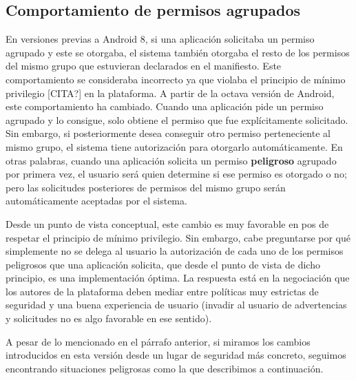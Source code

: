 \subsection{Comportamiento de permisos agrupados}
\label{subsection:recent-changes:grouped-permissions}
En versiones previas a Android 8, si una aplicación solicitaba un permiso agrupado y este se otorgaba, el
sistema también otorgaba el resto de los permisos del mismo grupo que estuvieran declarados en el
manifiesto. Este comportamiento se consideraba incorrecto ya que violaba el principio de mínimo
privilegio [CITA?] en la plataforma. A partir de la octava versión de Android, este comportamiento ha
cambiado. Cuando una aplicación pide un permiso agrupado y lo consigue, solo obtiene el permiso que fue
explícitamente solicitado. Sin embargo, si posteriormente desea conseguir otro permiso perteneciente al
mismo grupo, el sistema tiene autorización para otorgarlo automáticamente. En otras palabras, cuando una
aplicación solicita un permiso \textbf{peligroso} agrupado por primera vez, el usuario será quien
determine si ese permiso es otorgado o no; pero las solicitudes posteriores de permisos del mismo grupo
serán automáticamente aceptadas por el sistema.

Desde un punto de vista conceptual, este cambio es muy favorable en pos de respetar el principio de
mínimo privilegio. Sin embargo, cabe preguntarse por qué simplemente no se delega al usuario la
autorización de cada uno de los permisos peligrosos que una aplicación solicita, que desde el punto de
vista de dicho principio, es una implementación óptima. La respuesta está en la negociación que los
autores de la plataforma deben mediar entre políticas muy estrictas de seguridad y una buena experiencia
de usuario (invadir al usuario de advertencias y solicitudes no es algo favorable en ese sentido).

A pesar de lo mencionado en el párrafo anterior, si miramos los cambios introducidos en esta versión
desde un lugar de seguridad más concreto, seguimos encontrando situaciones peligrosas como la que
describimos a continuación.

